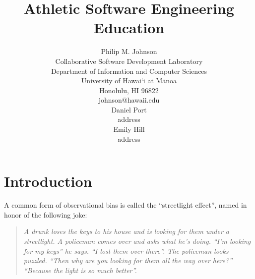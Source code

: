 \documentclass[]{article}
\begin{document}


\title{{\bf Athletic Software Engineering Education}} 

\author{Philip M. Johnson\\
        Collaborative Software Development Laboratory\\
        Department of Information and Computer Sciences\\
        University of Hawai`i at M\=anoa\\
        Honolulu, HI 96822\\
        johnson@hawaii.edu\\
\medskip
        Daniel Port\\
        address\\
\medskip
        Emily Hill\\
        address\\
}


\maketitle

\thispagestyle{empty}


\setlength{\parskip}{3pt plus 1pt minus 1pt} 

\section{Introduction}

A common form of observational bias is called the ``streetlight effect'', named in honor of the
following joke:

\begin{quotation}
{\em A drunk loses the keys to his house and is looking for them under a streetlight. A policeman
comes over and asks what he's doing. ``I'm looking for my keys'' he says. ``I lost them over there''.
The policeman looks puzzled. ``Then why are you looking for them all the way over here?''
``Because the light is so much better''.}
\end{quotation}
  
%
%
\end{document}
